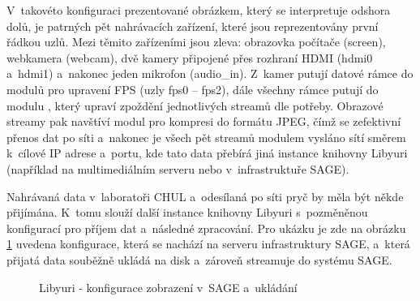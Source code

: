 \documentclass[thesis=M,czech]{FITthesis}[2012/06/26]
\begin{document}
V~takovéto konfiguraci prezentované obrázkem, který se interpretuje odshora dolů, je patrných pět nahrávacích zařízení, které jsou reprezentovány první řádkou uzlů. Mezi těmito zařízeními jsou zleva: obrazovka počítače (screen), webkamera (webcam), dvě kamery připojené přes rozhraní HDMI (hdmi0 a~hdmi1) a~nakonec jeden mikrofon (audio\_in). Z~kamer putují datové rámce do modulů pro upravení FPS (uzly fps0 -- fps2), dále všechny rámce putují do modulu , který upraví zpoždění jednotlivých streamů dle potřeby. Obrazové streamy pak navštíví modul  pro kompresi do formátu JPEG, čímž se zefektivní přenos dat po síti a~nakonec je všech pět streamů modulem  vysláno sítí směrem k~cílové IP adrese a~portu, kde tato data přebírá jiná instance knihovny Libyuri (například na multimediálním serveru nebo v~infrastruktuře SAGE). 

Nahrávaná data v~laboratoři CHUL a~odesílaná po síti pryč by měla být někde přijímána. K~tomu slouží další instance knihovny Libyuri s~pozměněnou konfigurací pro příjem dat a~následné zpracování. Pro ukázku je zde na obrázku \ref{img:navrh_backend_libyuri_receiver} uvedena konfigurace, která se nachází na serveru infrastruktury SAGE, a~která přijatá data souběžně ukládá na disk a~zároveň streamuje do systému SAGE.
\\
\begin{figure}[h]\centering
	\caption{Libyuri - konfigurace zobrazení v~SAGE a~ukládání}\label{img:navrh_backend_libyuri_receiver}
\end{figure}
\end{document}
